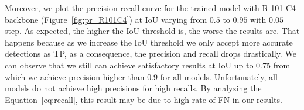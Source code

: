 %
%




Moreover, we plot the precision-recall curve for the trained model with R-101-C4 backbone %
(Figure~\ref{fig:pr_R101C4}) at IoU varying from $0.5$ to $0.95$ with $0.05$ step.
As expected, the higher the IoU threshold is, the worse the results are.
That happens because as we increase the IoU threshold we only accept more accurate detections as TP,
as a consequence, the precision and recall drops drastically.
We can observe that we still can achieve satisfactory results at IoU up to $0.75$ from which we achieve precision higher than $0.9$ for all models.
Unfortunately, all models do not achieve high precisions for high recalls.
By analyzing the Equation~\eqref{eq:recall}, this result may be due to high rate of FN in our results.


